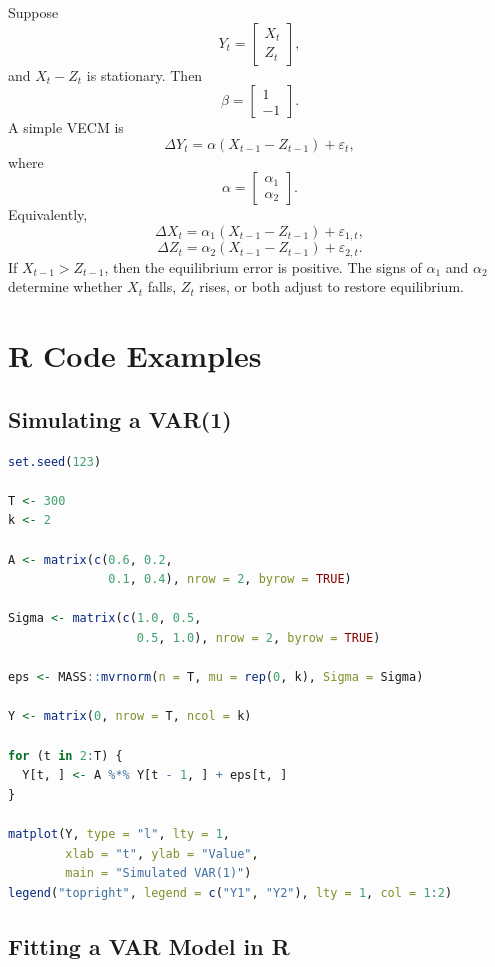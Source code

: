 \documentclass[12pt,oneside]{book}
\numberwithin{equation}{section}
\theoremstyle{definition}
\theoremstyle{plain}
\theoremstyle{remark}
\begin{document}
Suppose
\[
Y_t=
\begin{bmatrix}
X_t\\
Z_t
\end{bmatrix},
\]
and $X_t-Z_t$ is stationary. Then
\[
\beta=
\begin{bmatrix}
1\\
-1
\end{bmatrix}.
\]
A simple VECM is
\[
\Delta Y_t
=
\alpha(X_{t-1}-Z_{t-1})
+
\varepsilon_t,
\]
where
\[
\alpha=
\begin{bmatrix}
\alpha_1\\
\alpha_2
\end{bmatrix}.
\]
Equivalently,
\[
\Delta X_t=\alpha_1(X_{t-1}-Z_{t-1})+\varepsilon_{1,t},
\]
\[
\Delta Z_t=\alpha_2(X_{t-1}-Z_{t-1})+\varepsilon_{2,t}.
\]
If $X_{t-1}>Z_{t-1}$, then the equilibrium error is positive. The signs of $\alpha_1$ and $\alpha_2$ determine whether $X_t$ falls, $Z_t$ rises, or both adjust to restore equilibrium.

\section{R Code Examples}

\subsection{Simulating a VAR(1)}

\begin{lstlisting}[language=R, caption={Simulating a bivariate VAR(1) process}]
set.seed(123)

T <- 300
k <- 2

A <- matrix(c(0.6, 0.2,
              0.1, 0.4), nrow = 2, byrow = TRUE)

Sigma <- matrix(c(1.0, 0.5,
                  0.5, 1.0), nrow = 2, byrow = TRUE)

eps <- MASS::mvrnorm(n = T, mu = rep(0, k), Sigma = Sigma)

Y <- matrix(0, nrow = T, ncol = k)

for (t in 2:T) {
  Y[t, ] <- A %*% Y[t - 1, ] + eps[t, ]
}

matplot(Y, type = "l", lty = 1,
        xlab = "t", ylab = "Value",
        main = "Simulated VAR(1)")
legend("topright", legend = c("Y1", "Y2"), lty = 1, col = 1:2)
\end{lstlisting}

\subsection{Fitting a VAR Model in R}
\end{document}
